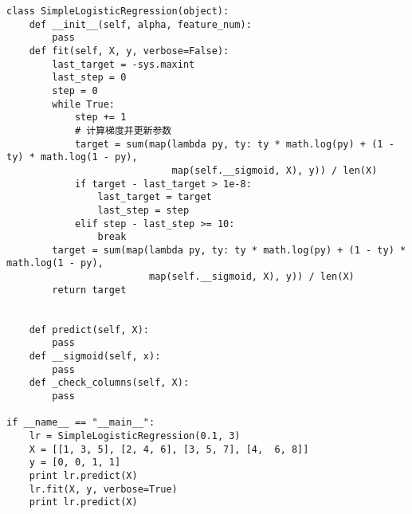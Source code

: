 \documentclass[10pt,a4paper]{ctexbook}
\begin{document}
\begin{verbatim}
class SimpleLogisticRegression(object):
    def __init__(self, alpha, feature_num):
        pass
    def fit(self, X, y, verbose=False):
        last_target = -sys.maxint
        last_step = 0
        step = 0
        while True:
            step += 1
            # 计算梯度并更新参数
            target = sum(map(lambda py, ty: ty * math.log(py) + (1 - ty) * math.log(1 - py),
                             map(self.__sigmoid, X), y)) / len(X)
            if target - last_target > 1e-8:
                last_target = target
                last_step = step
            elif step - last_step >= 10:
                break
        target = sum(map(lambda py, ty: ty * math.log(py) + (1 - ty) * math.log(1 - py),
                         map(self.__sigmoid, X), y)) / len(X)
        return target


    def predict(self, X):
        pass
    def __sigmoid(self, x):
        pass
    def _check_columns(self, X):
        pass

if __name__ == "__main__":
    lr = SimpleLogisticRegression(0.1, 3)
    X = [[1, 3, 5], [2, 4, 6], [3, 5, 7], [4,  6, 8]]
    y = [0, 0, 1, 1]
    print lr.predict(X)
    lr.fit(X, y, verbose=True)
    print lr.predict(X)
\end{verbatim}
\end{document}
